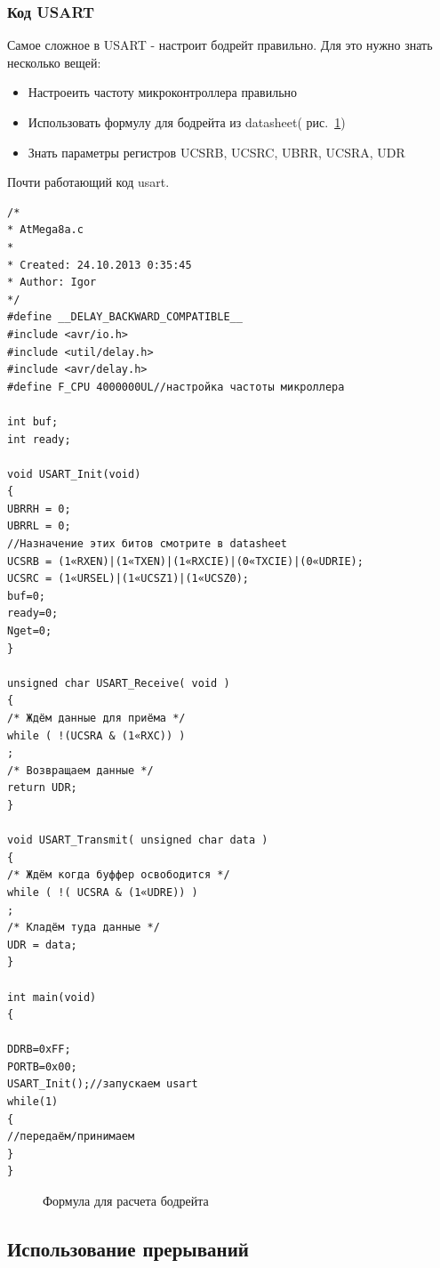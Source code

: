 \documentclass[12pt]{article}
\begin{document}
\subsubsection{Код USART}
Самое сложное в USART - настроит бодрейт правильно. Для это нужно знать несколько вещей:
\begin{itemize}
\item Настроеить частоту микроконтроллера правильно
\item Использовать формулу для бодрейта из datasheet( рис.~\ref{eq1})
\item Знать параметры регистров UCSRB, UCSRC, UBRR, UCSRA, UDR
\end{itemize}
Почти работающий код usart.
\begin{verbatim}
/*
* AtMega8a.c
*
* Created: 24.10.2013 0:35:45
* Author: Igor
*/
#define __DELAY_BACKWARD_COMPATIBLE__
#include <avr/io.h>
#include <util/delay.h>
#include <avr/delay.h>
#define F_CPU 4000000UL//настройка частоты микроллера

int buf;
int ready;

void USART_Init(void)
{
UBRRH = 0;
UBRRL = 0;
//Назначение этих битов смотрите в datasheet
UCSRB = (1«RXEN)|(1«TXEN)|(1«RXCIE)|(0«TXCIE)|(0«UDRIE);
UCSRC = (1«URSEL)|(1«UCSZ1)|(1«UCSZ0);
buf=0;
ready=0;
Nget=0;
}

unsigned char USART_Receive( void )
{
/* Ждём данные для приёма */
while ( !(UCSRA & (1«RXC)) )
;
/* Возвращаем данные */
return UDR;
}

void USART_Transmit( unsigned char data )
{
/* Ждём когда буффер освободится */
while ( !( UCSRA & (1«UDRE)) )
;
/* Кладём туда данные */
UDR = data;
}

int main(void)
{

DDRB=0xFF; 
PORTB=0x00; 
USART_Init();//запускаем usart
while(1)
{
//передаём/принимаем
}
}
\end{verbatim}
\begin{figure}[h!]
\caption{Формула для расчета бодрейта}
\label{eq1}
\end{figure}
\newpage
\subsection{Использование прерываний}
\end{document}
